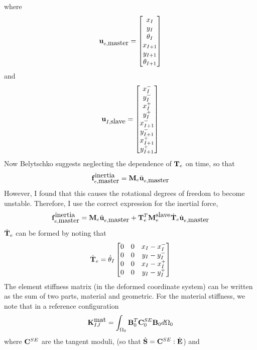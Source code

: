 \documentclass{article}
\begin{document}
where 
\[ {\bf u}_{e,\mbox{master}} = \begin{bmatrix}  x_I \\ y_I \\ \theta_I \\ x_{I+1} \\ y_{I+1} \\ \theta_{I+1} \end{bmatrix} \]
and
\[ {\bf u}_{I,\mbox{slave}} = \begin{bmatrix}  x_I^- \\ y_I^- \\  x_I^+ \\ y_I^+ \\ x_{I+1}^- \\ y_{I+1}^- \\  x_{I+1}^+ \\ y_{I+1}^+ \end{bmatrix} \]
Now Belytschko suggests neglecting the dependence of ${\bf T}_e$ on time, so that
\[ {\bf f}^{\mbox{inertia}}_{e, \mbox{master}} = {\bf M}_e \ddot{\bf u}_{e,\mbox{master}} \] 
However, I found that this causes the rotational degrees of freedom to become unstable.
Therefore, I use the correct expression for the inertial force,
\begin{equation}  {\bf f}^{\mbox{inertia}}_{e, \mbox{master}} = {\bf M}_e \ddot{\bf u}_{e,\mbox{master}} + {\bf T}_e^T {\bf M}^{\mbox{slave}}_e \dot{\bf T}_e \dot{\bf u}_{e,\mbox{master}}\label{eq:eq8800} \end{equation} 
$\dot{\bf T}_e$ can be formed by noting that
\begin{equation}  \dot{\bf T}_e = \dot{\theta}_I \begin{bmatrix} 
0 & 0 & x_I - x_I^- \\
0 & 0 & y_I - y_I^- \\
0 & 0 & x_I - x_I^+ \\
0 & 0 & y_I - y_I^+ 
\end{bmatrix} \label{eq:eq8900} \end{equation} 
The element stiffness matrix (in the deformed coordinate system) can be written as the sum of two parts, material and geometric.
For the material stiffness, we note that in a reference configuration
\begin{equation}  {\bf K}^{\mbox{mat}}_{IJ} = \int_{\Omega_0} {\bf B}_0^T {\bf C}_0^{SE}   {\bf B}_0 d\Omega_0 \label{eq:eq9000} \end{equation} 
where ${\bf C}^{SE}$ are the tangent moduli, (so that $\dot{\bf S} = {\bf C}^{SE} : \dot{\bf E} $) and 
\end{document}
